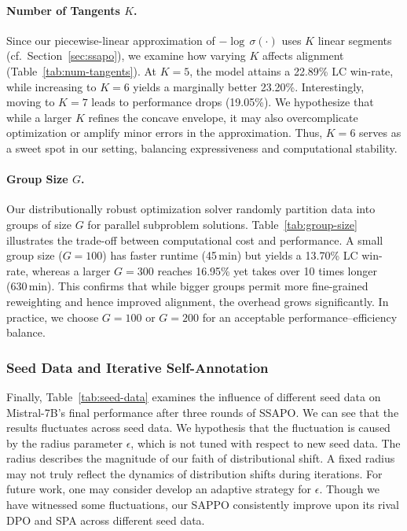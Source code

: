 \paragraph{Number of Tangents $K$.}
Since our piecewise-linear approximation of $-\!\log\,\sigma(\cdot)$ uses $K$ linear segments (cf.\ Section~\ref{sec:ssapo}), we examine how varying $K$ affects alignment (Table~\ref{tab:num-tangents}). 
At $K=5$, the model attains a 22.89\% LC win-rate, while increasing to $K=6$ yields a marginally better 23.20\%. 
Interestingly, moving to $K=7$ leads to performance drops (19.05\%). 
We hypothesize that while a larger $K$ refines the concave envelope, it may also overcomplicate optimization or amplify minor errors in the approximation. Thus, $K=6$ serves as a sweet spot in our setting, balancing expressiveness and computational stability.

\paragraph{Group Size $G$.}
Our distributionally robust optimization solver randomly partition data into groups of size $G$ for parallel subproblem solutions. Table~\ref{tab:group-size} illustrates the trade-off between computational cost and performance. 
A small group size ($G=100$) has faster runtime (45\,min) but yields a 13.70\% LC win-rate, whereas a larger $G=300$ reaches 16.95\% yet takes over 10 times longer (630\,min). 
This confirms that while bigger groups permit more fine-grained reweighting and hence improved alignment, the overhead grows significantly. 
In practice, we choose $G=100$ or $G=200$ for an acceptable performance--efficiency balance.

\subsubsection{Seed Data and Iterative Self-Annotation}
Finally, Table~\ref{tab:seed-data} examines the influence of different seed data on Mistral-7B’s final performance after three rounds of SSAPO. We can see that the results fluctuates across seed data. We hypothesis that the fluctuation is caused by the radius parameter $\epsilon$, which is not tuned with respect to new seed data. The radius describes the magnitude of our faith of distributional shift. A fixed radius may not truly reflect the dynamics of distribution shifts during iterations. For future work, one may consider develop an adaptive strategy for $\epsilon$. Though we have witnessed some fluctuations, our SAPPO consistently improve upon its rival DPO and SPA across different seed data. 

